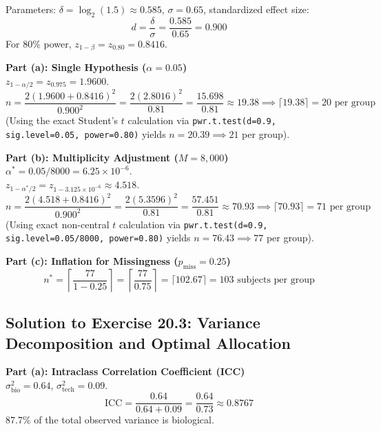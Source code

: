 \documentclass[11pt,twoside,openright]{book}
\begin{document}
Parameters: $\delta = \log_2(1.5) \approx 0.585$, $\sigma = 0.65$, standardized effect size:
\begin{equation}
d = \frac{\delta}{\sigma} = \frac{0.585}{0.65} = 0.900
\end{equation}
For 80\% power, $z_{1 - \beta} = z_{0.80} = 0.8416$.

\noindent
\textbf{Part (a): Single Hypothesis ($\alpha = 0.05$)}\\
$z_{1 - \alpha/2} = z_{0.975} = 1.9600$.
\begin{equation}
n = \frac{2 (1.9600 + 0.8416)^2}{0.900^2} = \frac{2 (2.8016)^2}{0.81} = \frac{15.698}{0.81} \approx 19.38 \implies \lceil 19.38 \rceil = 20 \text{ per group}
\end{equation}
(Using the exact Student's $t$ calculation via \texttt{pwr.t.test(d=0.9, sig.level=0.05, power=0.80)} yields $n = 20.39 \implies 21$ per group).

\noindent
\textbf{Part (b): Multiplicity Adjustment ($M = 8,000$)}\\
$\alpha^* = 0.05 / 8000 = 6.25 \times 10^{-6}$.\\
$z_{1 - \alpha^*/2} = z_{1 - 3.125 \times 10^{-6}} \approx 4.518$.
\begin{equation}
n = \frac{2 (4.518 + 0.8416)^2}{0.900^2} = \frac{2 (5.3596)^2}{0.81} = \frac{57.451}{0.81} \approx 70.93 \implies \lceil 70.93 \rceil = 71 \text{ per group}
\end{equation}
(Using exact non-central $t$ calculation via \texttt{pwr.t.test(d=0.9, sig.level=0.05/8000, power=0.80)} yields $n = 76.43 \implies 77$ per group).

\noindent
\textbf{Part (c): Inflation for Missingness ($p_{\text{miss}} = 0.25$)}\\
\begin{equation}
n^* = \left\lceil \frac{77}{1 - 0.25} \right\rceil = \left\lceil \frac{77}{0.75} \right\rceil = \lceil 102.67 \rceil = 103 \text{ subjects per group}
\end{equation}

\subsection{Solution to Exercise 20.3: Variance Decomposition and Optimal Allocation}

\noindent
\textbf{Part (a): Intraclass Correlation Coefficient (ICC)}\\
$\sigma^2_{\text{bio}} = 0.64$, $\sigma^2_{\text{tech}} = 0.09$.
\begin{equation}
\text{ICC} = \frac{0.64}{0.64 + 0.09} = \frac{0.64}{0.73} \approx 0.8767
\end{equation}
87.7\% of the total observed variance is biological.
\end{document}
